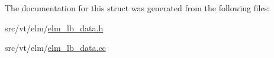 The documentation for this struct was generated from the following files\+:\begin{DoxyCompactItemize}
\item 
src/vt/elm/\hyperlink{elm__lb__data_8h}{elm\+\_\+lb\+\_\+data.\+h}\item 
src/vt/elm/\hyperlink{elm__lb__data_8cc}{elm\+\_\+lb\+\_\+data.\+cc}\end{DoxyCompactItemize}

